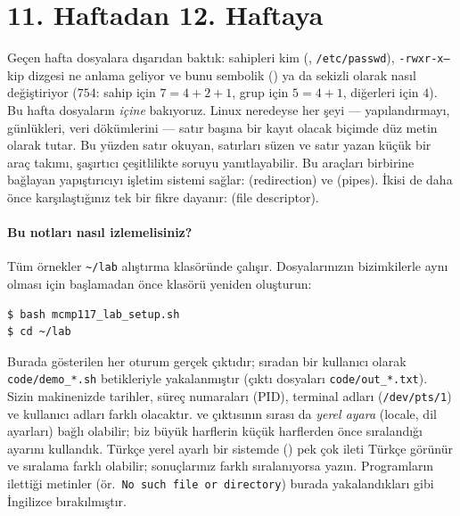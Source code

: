 \setcounter{tocdepth}{1}
\tableofcontents

\section{11. Haftadan 12. Haftaya}

Geçen hafta dosyalara dışarıdan baktık: sahipleri kim (, \texttt{/etc/passwd}), \texttt{-rwxr-x---} kip dizgesi ne anlama geliyor ve  bunu sembolik () ya da sekizli olarak nasıl değiştiriyor ($754$: sahip için $7 = 4+2+1$, grup için $5 = 4+1$, diğerleri için $4$). Bu hafta dosyaların \emph{içine} bakıyoruz. Linux neredeyse her şeyi --- yapılandırmayı, günlükleri, veri dökümlerini --- satır başına bir kayıt olacak biçimde düz metin olarak tutar. Bu yüzden satır okuyan, satırları süzen ve satır yazan küçük bir araç takımı, şaşırtıcı çeşitlilikte soruyu yanıtlayabilir. Bu araçları birbirine bağlayan yapıştırıcıyı işletim sistemi sağlar:  (redirection) ve  (pipes). İkisi de daha önce karşılaştığınız tek bir fikre dayanır:  (file descriptor).

\paragraph{Bu notları nasıl izlemelisiniz?} Tüm örnekler \texttt{\textasciitilde/lab} alıştırma klasöründe çalışır. Dosyalarınızın bizimkilerle aynı olması için başlamadan önce klasörü yeniden oluşturun:
\begin{lstlisting}[style=term]
$ bash mcmp117_lab_setup.sh
$ cd ~/lab
\end{lstlisting}
Burada gösterilen her oturum gerçek çıktıdır; sıradan bir kullanıcı olarak \texttt{code/demo\_*.sh} betikleriyle yakalanmıştır (çıktı dosyaları \texttt{code/out\_*.txt}). Sizin makinenizde tarihler, süreç numaraları (PID), terminal adları (\texttt{/dev/pts/1}) ve kullanıcı adları farklı olacaktır.  ve  çıktısının sırası da \emph{yerel ayara} (locale, dil ayarları) bağlı olabilir; biz büyük harflerin küçük harflerden önce sıralandığı  ayarını kullandık. Türkçe yerel ayarlı bir sistemde () pek çok ileti Türkçe görünür ve sıralama farklı olabilir; sonuçlarınız farklı sıralanıyorsa  yazın. Programların ilettiği metinler (ör.\ \texttt{No such file or directory}) burada yakalandıkları gibi İngilizce bırakılmıştır.

